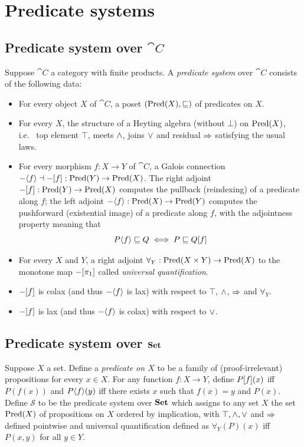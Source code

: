 \section{Predicate systems}
\label{sec:predicate-system}

\subsection{Predicate system over $\cat{C}$}

Suppose $\cat{C}$ a category with finite products. A \emph{predicate system} over $\cat{C}$ consists of the
following data:
\begin{itemize}
\item For every object $X$ of $\cat{C}$, a poset $(\mathrm{Pred}(X), \sqsubseteq)$ of predicates on $X$.
\item For every $X$, the structure of a Heyting algebra (without $\bot$) on $\mathrm{Pred}(X)$, i.e.~ top element
   $\top$, meets $\wedge$, joins $\vee$ and residual $\Rightarrow$ satisfying the usual laws.
\item For every morphism $f: X \to Y$ of $\cat{C}$, a Galois connection $-\langle f\rangle \dashv
-[f] : \mathrm{Pred}(Y) \to \mathrm{Pred}(X)$. The right adjoint $-[f]: \mathrm{Pred}(Y) \to \mathrm{Pred}(X)$ computes
the pullback (reindexing) of a predicate along $f$; the left adjoint $-\langle f\rangle: \mathrm{Pred}(X) \to
\mathrm{Pred}(Y)$ computes the pushforward (existential image) of a predicate along $f$, with the adjointness property
meaning that
\[P\langle f\rangle \sqsubseteq Q \iff P \sqsubseteq Q[f] \]
\item For every $X$ and $Y$, a right adjoint $\forall_Y: \mathrm{Pred}(X \times Y) \to \mathrm{Pred}(X)$ to the monotone map
$-[\pi_1]$ called \emph{universal quantification}. 
\item $-[f]$ is colax (and thus $-\langle f\rangle$ is lax) with respect to $\top$, $\wedge$,
$\Rightarrow$ and $\forall_Y$.
\item $-[f]$ is lax (and thus $-\langle f\rangle$ is colax) with respect to $\vee$.
\end{itemize}

\subsection{Predicate system over $\mathbf{Set}$}

Suppose $X$ a set. Define a \emph{predicate on $X$} to be a family of (proof-irrelevant) propositions for
every $x \in X$. For any function $f: X \to Y$, define $P[f](x)$ iff $P(f(x))$ and
$P\langle f\rangle(y)$ iff there exists $x$ such that $f(x) = y$ and $P(x)$. Define $\mathcal{S}$ to be the
predicate system over $\mathbf{Set}$ which assigns to any set $X$ the set $\mathrm{Pred}(X)$ of propositions on $X$ ordered by
implication, with $\top, \wedge, \vee$ and $\Rightarrow$ defined pointwise and universal quantification defined
as $\forall_Y(P)(x)$ iff $P(x,y)$ for all $y \in Y$.

